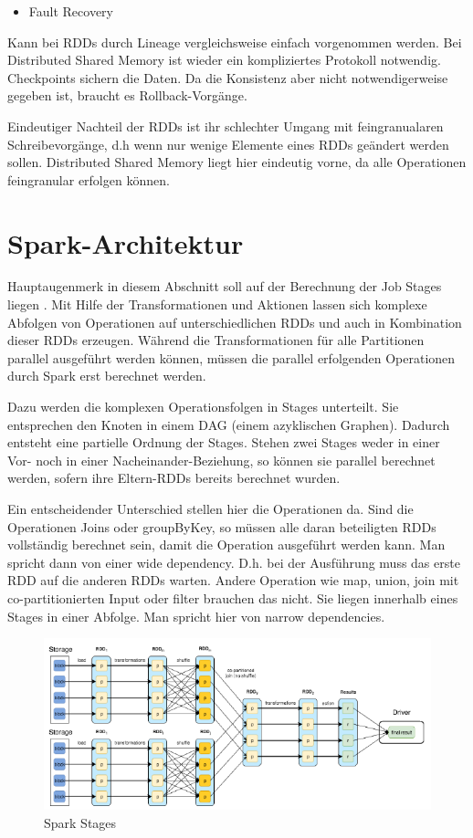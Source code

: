 \begin{itemize}
\item Fault Recovery
\end{itemize}
Kann bei RDDs durch Lineage vergleichsweise einfach vorgenommen werden.
Bei Distributed Shared Memory ist wieder ein kompliziertes Protokoll
notwendig. Checkpoints sichern die Daten. Da die Konsistenz aber nicht
notwendigerweise gegeben ist, braucht es Rollback-Vorgänge. 

Eindeutiger Nachteil der RDDs ist ihr schlechter Umgang mit
feingranualaren Schreibevorgänge, d.h wenn nur wenige Elemente eines
RDDs geändert werden sollen. Distributed Shared Memory liegt hier
eindeutig vorne, da alle Operationen feingranular erfolgen können.

\section[Spark{}-Architektur]{\rmfamily
Spark-Architektur}
Hauptaugenmerk in diesem Abschnitt soll auf der Berechnung der Job
Stages liegen \cite{SparkInternals}. Mit Hilfe der Transformationen und Aktionen lassen sich
komplexe Abfolgen von Operationen auf unterschiedlichen RDDs und auch
in Kombination dieser RDDs erzeugen. Während die Transformationen für
alle Partitionen parallel ausgeführt werden können, müssen die parallel
erfolgenden Operationen durch Spark erst berechnet werden.

Dazu werden die komplexen Operationsfolgen in Stages unterteilt. Sie
entsprechen den Knoten in einem DAG (einem azyklischen Graphen).
Dadurch entsteht eine partielle Ordnung der Stages. Stehen zwei Stages
weder in einer Vor- noch in einer Nacheinander-Beziehung, so können sie
parallel berechnet werden, sofern ihre Eltern-RDDs bereits berechnet
wurden. 

Ein entscheidender Unterschied stellen hier die Operationen da. Sind die
Operationen Joins oder groupByKey, so müssen alle daran beteiligten
RDDs vollständig berechnet sein, damit die Operation ausgeführt werden
kann. Man spricht dann von einer wide dependency. D.h. bei der
Ausführung muss das erste RDD auf die anderen RDDs warten. Andere
Operation wie map, union, join mit co-partitionierten Input oder filter
brauchen das nicht. Sie liegen innerhalb eines Stages in einer Abfolge.
Man spricht hier von narrow dependencies.

\begin{figure}
\centering
\includegraphics[width=\textwidth]{bilder/Seminartext-img2.png}
\caption{Spark Stages \cite{SparkInternals}}
\end{figure}

